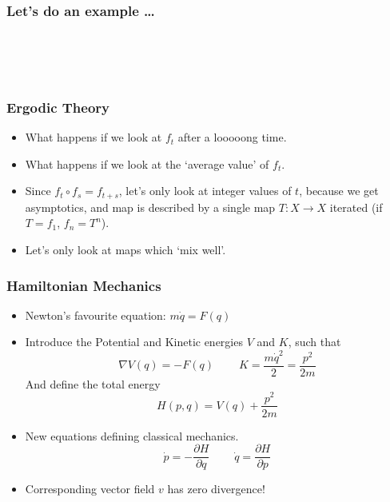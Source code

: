 \documentclass{beamer}
\begin{document}
\begin{frame}
\frametitle{Let's do an example \dots}
\begin{center}
\\
\vspace{1em}
\\
\vspace{1em}
\\
\vspace{1em}
\end{center}
\end{frame}

\begin{frame}
\frametitle{Ergodic Theory}
\begin{itemize}
    \item<1-> What happens if we look at $f_t$ after a looooong time.
    \item<2-> What happens if we look at the `average value' of $f_t$.
    \item<3-> Since $f_t \circ f_s = f_{t+s}$, let's only look at integer values of $t$, because we get asymptotics, and map is described by a single map $T: X \to X$ iterated (if $T = f_1$, $f_n = T^n$).
    \item<4-> Let's only look at maps which `mix well'.
\end{itemize}
\end{frame}

\begin{frame}
\frametitle{Hamiltonian Mechanics}
\begin{itemize}
    \item<1-> Newton's favourite equation: $m\dot{q} = F(q)$
    \item<2-> Introduce the Potential and Kinetic energies $V$ and $K$, such that
    \[ \nabla V(q) = - F(q)\ \ \ \ \ \ \ \ \ \ K = \frac{m \dot{q}^2}{2} = \frac{p^2}{2m} \]
    And define the total energy
    \[ H(p,q) = V(q) + \frac{p^2}{2m} \]
    \item<3-> New equations defining classical mechanics.
    \[ \dot{p} = - \frac{\partial H}{\partial q}\ \ \ \ \ \ \ \ \ \ \dot{q} = \frac{\partial H}{\partial p} \]
    \item<4-> Corresponding vector field $v$ has zero divergence!
\end{itemize}
\end{frame}
\end{document}
